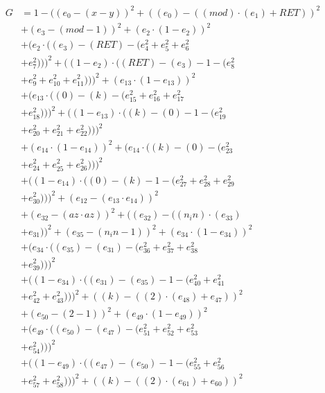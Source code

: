 \documentclass[10pt, a4paper]{article}
\begin{document}
\begin{small}
\begin{align*}
G &= 1 - ((e_{0} - (x - y))^{2} + ((e_{0}) - ((mod)  \cdot  (e_{1}) + RET))^{2} \\
& + (e_{3} - (mod - 1))^{2} + (e_{2}  \cdot  (1 - e_{2}))^{2} \\
& + (e_{2}  \cdot  ((e_{3}) - (RET) - (e_{4}^{2} + e_{5}^{2} + e_{6}^{2} \\
& + e_{7}^{2})))^{2} + ((1 - e_{2})  \cdot  ((RET) - (e_{3}) - 1 - (e_{8}^{2} \\
& + e_{9}^{2} + e_{10}^{2} + e_{11}^{2})))^{2} + (e_{13}  \cdot  (1 - e_{13}))^{2} \\
& + (e_{13}  \cdot  ((0) - (k) - (e_{15}^{2} + e_{16}^{2} + e_{17}^{2} \\
& + e_{18}^{2})))^{2} + ((1 - e_{13})  \cdot  ((k) - (0) - 1 - (e_{19}^{2} \\
& + e_{20}^{2} + e_{21}^{2} + e_{22}^{2})))^{2} \\
& + (e_{14}  \cdot  (1 - e_{14}))^{2} + (e_{14}  \cdot  ((k) - (0) - (e_{23}^{2} \\
& + e_{24}^{2} + e_{25}^{2} + e_{26}^{2})))^{2} \\
& + ((1 - e_{14})  \cdot  ((0) - (k) - 1 - (e_{27}^{2} + e_{28}^{2} + e_{29}^{2} \\
& + e_{30}^{2})))^{2} + (e_{12} - (e_{13}  \cdot  e_{14}))^{2} \\
& + (e_{32} - (az  \cdot  az))^{2} + ((e_{32}) - ((n_in)  \cdot  (e_{33}) \\
& + e_{31}))^{2} + (e_{35} - (n_in - 1))^{2} + (e_{34}  \cdot  (1 - e_{34}))^{2} \\
& + (e_{34}  \cdot  ((e_{35}) - (e_{31}) - (e_{36}^{2} + e_{37}^{2} + e_{38}^{2} \\
& + e_{39}^{2})))^{2} \\
& + ((1 - e_{34})  \cdot  ((e_{31}) - (e_{35}) - 1 - (e_{40}^{2} + e_{41}^{2} \\
& + e_{42}^{2} + e_{43}^{2})))^{2} + ((k) - ((2)  \cdot  (e_{48}) + e_{47}))^{2} \\
& + (e_{50} - (2 - 1))^{2} + (e_{49}  \cdot  (1 - e_{49}))^{2} \\
& + (e_{49}  \cdot  ((e_{50}) - (e_{47}) - (e_{51}^{2} + e_{52}^{2} + e_{53}^{2} \\
& + e_{54}^{2})))^{2} \\
& + ((1 - e_{49})  \cdot  ((e_{47}) - (e_{50}) - 1 - (e_{55}^{2} + e_{56}^{2} \\
& + e_{57}^{2} + e_{58}^{2})))^{2} + ((k) - ((2)  \cdot  (e_{61}) + e_{60}))^{2} \\

\end{align*}
\end{small}
\end{document}
